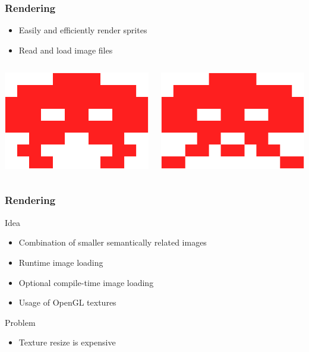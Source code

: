 \documentclass{beamer}
\newcommand{\<}[1]{\`#1}
\begin{document}
\begin{frame}
  \frametitle{Rendering}
  
  \begin{itemize}
  \item Easily and efficiently render sprites
  \item Read and load image files
  \end{itemize}

  \begin{block}{}
    \begin{columns}[c]
      \begin{column}[c]{2cm}
        \includegraphics[scale=0.2]{easy0}
      \end{column}
      \begin{column}[c]{2cm}
        \includegraphics[scale=0.2]{easy1}
      \end{column}
    \end{columns}
  \end{block}

\end{frame}

\begin{frame}
  \frametitle{Rendering}
  \begin{block}{Idea}
    \begin{itemize}
    \item Combination of smaller semantically related images
    \item Runtime image loading
    \item Optional compile-time image loading
    \item Usage of OpenGL textures
    \end{itemize}
  \end{block}
  
  \begin{block}{Problem}
    \begin{itemize}
    \item Texture resize is expensive
    \end{itemize}
  \end{block}
\end{frame}
\end{document}

